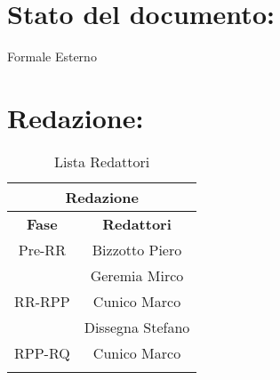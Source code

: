 \newpage

\begin{center} %
	\begin{Huge}	
				\textbf{\TITOLODOC}
			\\
	\end{Huge}
\end{center}


\section*{\LARGE Stato del documento:}
\indent \indent
	Formale Esterno

\section*{\LARGE Redazione:}
	\begin{table}[!h]
		\begin{center}
			\begin{tabular}
				{|c|c|}
				\hline
				\multicolumn{2}{|c|}{ \textbf{Redazione} } \\
				\hline
				\textbf{Fase} & \textbf{Redattori} \\
				\hline
				{Pre-RR} &  Bizzotto Piero \\ & Geremia Mirco \\
				\hline
				{RR-RPP} &  Cunico Marco \\ & Dissegna Stefano \\
				\hline
				{RPP-RQ} &  Cunico Marco \\ \\
				\hline
			\end{tabular}
			\caption{Lista Redattori} %
			\label{tabredazione}
		\end{center}
	\end{table}
	
